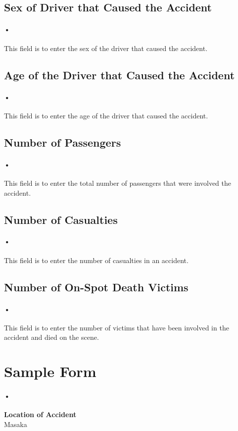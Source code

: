 \documentclass[12pt]{article}
\begin{document}
\subsection{Sex of Driver that Caused the Accident}
\paragraph{•}
This field is to enter the sex of the driver that caused the accident.
\subsection{Age of the Driver that Caused the Accident}
\paragraph{•}
This field is to enter the age of the driver that caused the accident.
\subsection{Number of Passengers}
\paragraph{•}
This field is to enter the total number of passengers that were involved the accident.
\subsection{Number of Casualties}
\paragraph{•}
This field is to enter the number of casualties in an accident.
\subsection{Number of On-Spot Death Victims}
\paragraph{•}
This field is to enter the number of victims that have been involved in the accident and died on the scene.

\section{Sample Form}
\paragraph{•}
\textbf{Location of Accident}\\
Masaka
\end{document}
